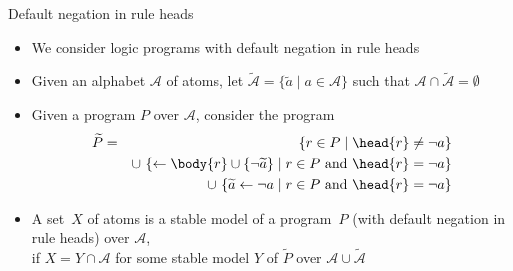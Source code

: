 \begin{frame}{Default negation in rule heads}

  \begin{itemize}
  \item<1-3> We consider logic programs with default negation in rule heads
  \item<2-> Given an alphabet $\mathcal{A}$ of atoms,
    let
    \(
    \widetilde{\mathcal{A}}=\{\widetilde{a}\mid a\in\mathcal{A}\}
    \)
    such that $\mathcal{A}\cap\widetilde{\mathcal{A}}=\emptyset$
  \item<3-> Given a program $P$ over $\mathcal{A}$, consider the program
    \begin{eqnarray*}
      \widetilde{P}
      &=&\phantom{\cup\ }
\{r\in P\mid \head{r}\neq{\neg a}\}
      \\
      &&\cup\
\{\leftarrow \body{r}\cup\{{\neg \widetilde{a}}\}\mid r\in P \text{ and } \head{r}={\neg a}\}
      \\
      &&\cup\
\{\widetilde{a}\leftarrow{\neg a}\mid r\in P \text{ and } \head{r}={\neg a}\}
    \end{eqnarray*}
    \smallskip
  \item<4->
    A set~$X$ of atoms is a \alert{stable model} of a program~$P$ (with default negation in rule heads) over $\mathcal{A}$,
    \\
    if $X=Y\cap\mathcal{A}$ for some stable model $Y$ of $\widetilde{P}$ over $\mathcal{A}\cup\widetilde{\mathcal{A}}$
  \end{itemize}
\end{frame}
%

